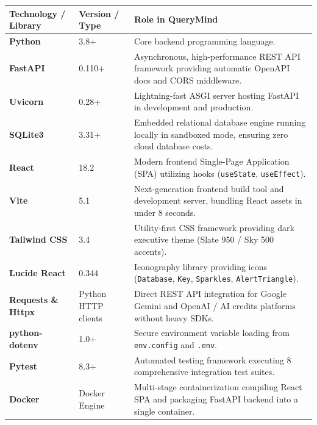 \documentclass[10pt,a4paper]{article}
\begin{document}
\begin{tabularx}{\textwidth}{l p{4cm} X}
\toprule
\textbf{Technology / Library} & \textbf{Version / Type} & \textbf{Role in QueryMind} \\
\midrule
\textbf{Python} & 3.8+ & Core backend programming language. \\
\addlinespace
\textbf{FastAPI} & 0.110+ & Asynchronous, high-performance REST API framework providing automatic OpenAPI docs and CORS middleware. \\
\addlinespace
\textbf{Uvicorn} & 0.28+ & Lightning-fast ASGI server hosting FastAPI in development and production. \\
\addlinespace
\textbf{SQLite3} & 3.31+ & Embedded relational database engine running locally in sandboxed mode, ensuring zero cloud database costs. \\
\addlinespace
\textbf{React} & 18.2 & Modern frontend Single-Page Application (SPA) utilizing hooks (\texttt{useState}, \texttt{useEffect}). \\
\addlinespace
\textbf{Vite} & 5.1 & Next-generation frontend build tool and development server, bundling React assets in under 8 seconds. \\
\addlinespace
\textbf{Tailwind CSS} & 3.4 & Utility-first CSS framework providing dark executive theme (Slate 950 / Sky 500 accents). \\
\addlinespace
\textbf{Lucide React} & 0.344 & Iconography library providing icons (\texttt{Database}, \texttt{Key}, \texttt{Sparkles}, \texttt{AlertTriangle}). \\
\addlinespace
\textbf{Requests \& Httpx} & Python HTTP clients & Direct REST API integration for Google Gemini and OpenAI / AI credits platforms without heavy SDKs. \\
\addlinespace
\textbf{python-dotenv} & 1.0+ & Secure environment variable loading from \texttt{env.config} and \texttt{.env}. \\
\addlinespace
\textbf{Pytest} & 8.3+ & Automated testing framework executing 8 comprehensive integration test suites. \\
\addlinespace
\textbf{Docker} & Docker Engine & Multi-stage containerization compiling React SPA and packaging FastAPI backend into a single container. \\
\bottomrule
\end{tabularx}
\end{document}
